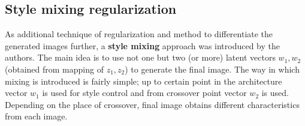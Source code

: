 \documentclass[12pt,a4paper,openany]{book}
\begin{document}



\subsection{Style mixing regularization}

As additional technique of regularization and method to differentiate the generated images further, a \textbf{style mixing} approach was introduced by the authors. The main idea is to use not one but two (or more) latent vectors $w_{1}, w_{2}$ (obtained from mapping of $z_{1}, z_{2}$) to generate the final image. The way in which mixing is introduced is fairly simple; up to certain point in the architecture vector $w_{1}$ is used for style control and from crossover point vector $w_{2}$ is used.
Depending on the place of crossover, final image obtains different characteristics from each image. 
\end{document}
